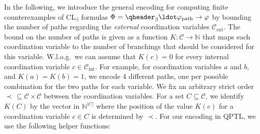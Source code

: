 \documentclass{LMCS}
\theoremstyle{plain}\newtheorem{theorem}[thm]{Theorem}
\theoremstyle{plain}\newtheorem{lemma}[thm]{Lemma}
\theoremstyle{plain}\newtheorem{proposition}[thm]{Proposition}
\theoremstyle{plain}\newtheorem{corollary}[thm]{Corollary}
\theoremstyle{definition}\newtheorem{definition}{Definition}[section]
\begin{document}
In the following, we introduce the general encoding for computing finite counterexamples of CL$_\exists$ formulas $\Phi = \qheader_\exists \ldot \varphi_{\text{path}} \rightarrow \varphi$ by bounding the number of paths regarding the \emph{external} coordination variables $\mathcal{C}_\text{ext}$.
The bound on the number of paths is given as a function $K : \mathcal{C} \rightarrow \mathbb{N}$ that maps each coordination variable to the number of branchings that should be considered for this variable.
W.l.o.g.\ we can assume that $K(c) = 0$ for every internal coordination variable $c \in \mathcal{C}_\text{int}$.
For example, for coordination variables $a$ and $b$, and  $K(a) = K(b) = 1$, we encode 4 different paths, one per possible combination for the two paths for each variable.
We fix an arbitrary strict order $\prec \,\subseteq \mathcal{C} \times \mathcal{C}$ between the coordination variables.
For a set $C \subseteq \mathcal{C}$, we identify $K(C)$ by the vector in $\mathbb{N}^{|C|}$ where the position of the value $K(c)$ for a coordination variable $c \in C$ is determined by $\prec$.
For our encoding in QPTL, we use the following helper functions:
\end{document}
